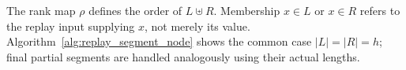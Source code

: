 
The rank map $\rho$ defines the order of $L\uplus R$.
Membership $x\in L$ or $x\in R$ refers to the replay input supplying
$x$, not merely its value.  Algorithm~\ref{alg:replay_segment_node}
shows the common case $|L|=|R|=h$; final partial segments are handled
analogously using their actual lengths.
